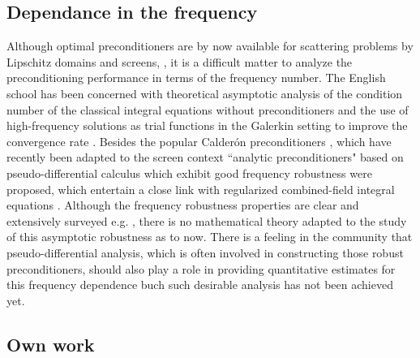 \documentclass[]{article}
\begin{document}
\subsection*{Dependance in the frequency}

Although optimal preconditioners are by now available for scattering problems by Lipschitz domains and screens, \cite{steinbach1998construction,hiptmair2006operator}, it is a difficult matter to analyze the preconditioning performance in terms of the frequency number. The English school has been concerned with theoretical asymptotic analysis of the condition number of the classical integral equations without preconditioners \cite{chandler2020high} and the use of high-frequency solutions as trial functions in the Galerkin setting to improve the convergence rate \cite{chandlerWilde2015high}. Besides the popular Calder\'{o}n preconditioners \cite{christiansen2000preconditionneurs,christiansen2002preconditioner}, which have recently been adapted to the screen context \cite{bruno2012second}  ``analytic preconditioners" based on pseudo-differential calculus which exhibit good frequency robustness \cite{antoine2007generalized} were proposed, which entertain a close link with regularized combined-field integral equations \cite{buffa2005regularized}. Although the frequency robustness properties are clear and extensively surveyed e.g. \cite{boubendir2014well}, there is no mathematical theory adapted to the study of this asymptotic robustness as to now. There is a feeling in the community that pseudo-differential analysis, which is often involved in constructing those robust preconditioners, should also play a role in providing quantitative estimates for this frequency dependence buch such desirable analysis has not been achieved yet.



\subsection*{Own work}
\end{document}
